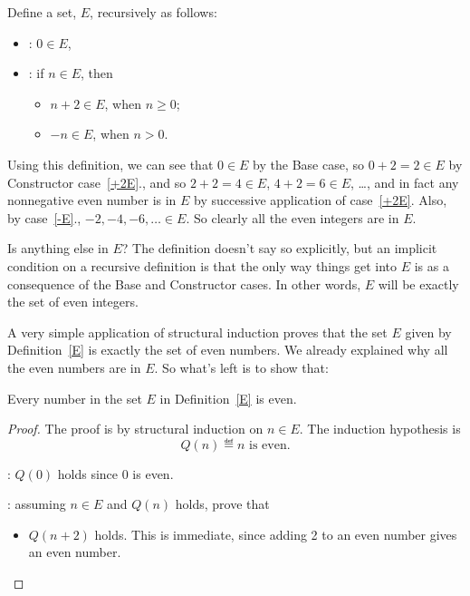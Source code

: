 \begin{definition}
\begin{editingnotes}
\begin{example*}
\begin{definition}\label{E}
Define a set, $E$, recursively as follows:
\begin{itemize}
\item {}: $0 \in E$,\label{0E}
\item {}: if $n \in E$, then
\begin{itemize}
\item $n+2 \in E$, when $n\geq 0$;\label{+2E}
\item $-n \in E$, when $n > 0$.\label{-E}
\end{itemize}
\end{itemize}

\end{definition}
\end{example*}

Using this definition, we can see that $0 \in E$ by the Base case, so $0 +
2 = 2 \in E$ by Constructor case~\ref{+2E}., and so $2+2 =4 \in E$, $4+2 =
6 \in E$, \dots, and in fact any nonnegative even number is in $E$ by
successive application of case~\ref{+2E}.  Also, by case~\ref{-E}.,
$-2,-4,-6,\dots \in E$.  So clearly all the even integers are in $E$.

Is anything else in $E$?  The definition doesn't say so explicitly, but an
implicit condition on a recursive definition is that the only way things
get into $E$ is as a consequence of the Base and Constructor cases.  In
other words, $E$ will be exactly the set of even integers.

A very simple application of structural induction proves that the set $E$
given by Definition~\ref{E} is exactly the set of even numbers.  We already
explained why all the even numbers are in $E$.  So what's left is to show
that:

\begin{lemma*}
Every number in the set $E$ in Definition~\ref{E} is even.
\begin{proof}
The proof is by structural induction on $n \in E$.  The induction
hypothesis is 
\[
Q(n) \eqdef \text{$n$ is even}.
\]

: $Q(0)$ holds since 0 is even.

: assuming $n \in E$ and $Q(n)$ holds, prove
that
\begin{itemize}

\item $Q(n+2)$ holds.  This is immediate, since adding 2 to an even number
  gives an even number.


\end{itemize}
\end{proof}
\end{lemma*}
\end{editingnotes}
\end{definition}
